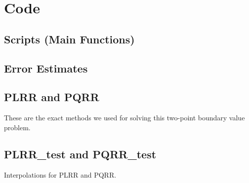 \documentclass[a4paper,english]{article}
\begin{document}
	\clearpage
	

	\section{Code}\label{Code}
	
	\subsection{Scripts (Main Functions)}
	
	
	
	
	
	
	\subsection{Error Estimates}
	
	
	
	\subsection{PLRR and PQRR}
	These are the exact methods we used for solving this 
	two-point boundary value problem.
	
	
	
	
	
		
	
	
	\subsection{PLRR\_test and PQRR\_test}
	Interpolations for PLRR and PQRR.
	
\end{document}
